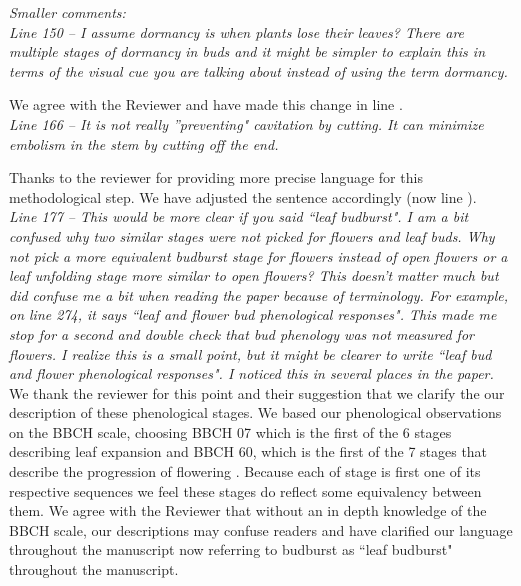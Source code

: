 \documentclass[11pt]{article}
\begin{document}
\emph{Smaller comments:}\\

\emph{Line 150 – I assume dormancy is when plants lose their leaves? There are multiple stages of dormancy in buds and it might be simpler to explain this in terms of the visual cue you are talking about instead of using the term dormancy.}

We agree with the Reviewer and have made this change in line .\\

\emph{Line 166 – It is not really ''preventing" cavitation by cutting. It can minimize embolism in the stem by cutting off the end.}

Thanks to the reviewer for providing more precise language for this methodological step. We have adjusted the sentence accordingly (now line ).\\


\emph{Line  177 – This would be more clear if you said ``leaf budburst". I am a bit confused why two similar stages were not picked for flowers and leaf buds. Why not pick a more equivalent budburst stage for flowers instead of open flowers or a leaf unfolding stage more similar to open flowers? This doesn’t matter much but did confuse me a bit when reading the paper because of terminology. For example, on line 274, it says ``leaf and flower bud phenological responses". This made me stop for a second and double check that bud phenology was not measured for flowers. I realize this is a small point, but it might be clearer to write ``leaf bud and flower phenological responses". I noticed this in several places in the paper.}\\



We thank the reviewer for this point and their suggestion that we clarify the our description of these phenological stages. We based our phenological observations on the BBCH scale, choosing BBCH 07 which is the first of the 6 stages describing leaf expansion and BBCH 60, which is the first of the 7 stages that describe the progression of flowering \citep{Finn2007}. Because each of stage is first one of its respective sequences we feel these stages do reflect some equivalency between them. %
We agree with the Reviewer that without an in depth knowledge of the BBCH scale, our descriptions may confuse readers and have clarified our language throughout the manuscript now referring to budburst as ``leaf budburst" throughout the manuscript.\\
\end{document}
